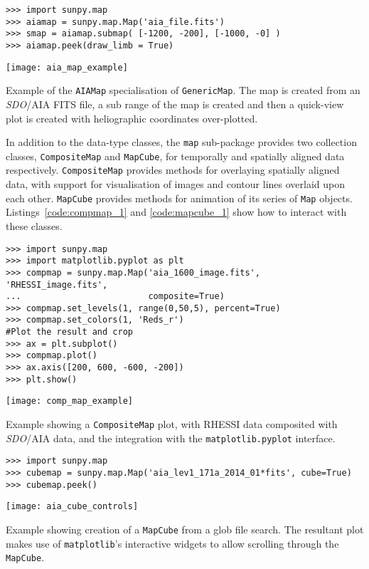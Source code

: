 \begin{listing}[H]
\begin{verbatim}
>>> import sunpy.map
>>> aiamap = sunpy.map.Map('aia_file.fits')
>>> smap = aiamap.submap( [-1200, -200], [-1000, -0] )
>>> aiamap.peek(draw_limb = True)
\end{verbatim}
\begin{center}
\texttt{[image: aia\_map\_example]}
\end{center}
\caption{Example of the \texttt{AIAMap} specialisation of 
\texttt{GenericMap}. The map is created from an \textit{SDO}/AIA FITS file, a sub range
of the map is created and then a quick-view plot is created with heliographic coordinates over-plotted.}
\label{code:aia_1}
\end{listing}

In addition to the data-type classes, the \texttt{map} sub-package provides two 
collection classes, \texttt{CompositeMap} and \texttt{MapCube}, for 
temporally and spatially aligned data respectively.
\texttt{CompositeMap} provides methods for overlaying spatially aligned 
data, with support for visualisation of images and contour lines overlaid 
upon each other.
\texttt{MapCube} provides methods for animation of its series of \texttt{Map} 
objects. Listings~\ref{code:compmap_1} and \ref{code:mapcube_1} show how to 
interact with these classes.

\begin{listing}[H]
\begin{verbatim}
>>> import sunpy.map
>>> import matplotlib.pyplot as plt
>>> compmap = sunpy.map.Map('aia_1600_image.fits', 'RHESSI_image.fits', 
...                         composite=True)
>>> compmap.set_levels(1, range(0,50,5), percent=True)
>>> compmap.set_colors(1, 'Reds_r')
#Plot the result and crop
>>> ax = plt.subplot()
>>> compmap.plot()
>>> ax.axis([200, 600, -600, -200])
>>> plt.show()
\end{verbatim}
\begin{center}
\texttt{[image: comp\_map\_example]}
\end{center}
\caption{Example showing a \texttt{CompositeMap} plot, with RHESSI data composited
with \textit{SDO}/AIA data, and the integration with the \texttt{matplotlib.pyplot} interface.}
\label{code:compmap_1}
\end{listing}

\begin{listing}[H]
\begin{verbatim}
>>> import sunpy.map
>>> cubemap = sunpy.map.Map('aia_lev1_171a_2014_01*fits', cube=True)
>>> cubemap.peek()
\end{verbatim}
\begin{center}
\texttt{[image: aia\_cube\_controls]}
\end{center}
\caption{Example showing creation of a \texttt{MapCube} from a glob file search. The 
resultant plot makes use of \texttt{matplotlib}'s interactive widgets to allow scrolling 
through the \texttt{MapCube}.}
\label{code:mapcube_1}
\end{listing}